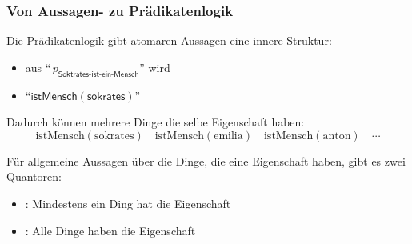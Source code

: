 \documentclass[onlymath]{beamer}
\begin{document}
% 
% 
% 
% 



\begin{frame}\frametitle{Von Aussagen- zu Prädikatenlogik}

Die Prädikatenlogik gibt atomaren Aussagen eine innere Struktur:
\begin{itemize}
\item aus "`$\,p_{\textsf{Soktrates-ist-ein-Mensch}}\!$"' wird
\item "`$\textsf{istMensch}(\textsf{sokrates})$"'
\end{itemize}\bigskip\pause

Dadurch können mehrere Dinge die selbe Eigenschaft haben:
\[ \text{istMensch}(\text{sokrates})\quad \text{istMensch}(\text{emilia})\quad \text{istMensch}(\text{anton})\quad\cdots\]

\pause Für allgemeine Aussagen über die Dinge, die eine Eigenschaft haben, gibt es zwei
\alert{Quantoren:}
\begin{itemize}
\item {}: Mindestens ein Ding hat die Eigenschaft
\item {}: Alle Dinge haben die Eigenschaft
\end{itemize}

\end{frame}
\end{document}
